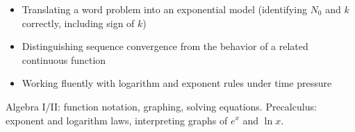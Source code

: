 \documentclass[11pt]{article}
\begin{document}
\begin{diffbox}
\begin{itemize}[nosep]
  \item Translating a word problem into an exponential model (identifying $N_0$ and $k$ correctly, including sign of $k$)
  \item Distinguishing sequence convergence from the behavior of a related continuous function
  \item Working fluently with logarithm and exponent rules under time pressure
\end{itemize}
\end{diffbox}

\begin{prereqbox}
Algebra I/II: function notation, graphing, solving equations. Precalculus: exponent
and logarithm laws, interpreting graphs of $e^x$ and $\ln x$.
\end{prereqbox}

\end{document}
